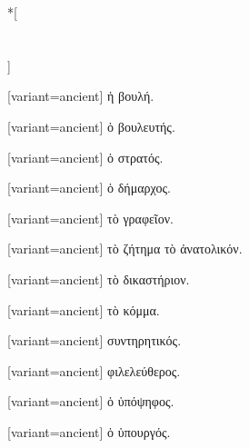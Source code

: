 \switchcolumn[0]*[{%
\section*{%
}}]
%
\switchcolumn
\begin{greek}[variant=ancient]%
ἡ βουλή.%
\end{greek}%
\switchcolumn*
{}%
\switchcolumn
\begin{greek}[variant=ancient]%
ὁ βουλευτής.%
\end{greek}%
\switchcolumn*
{}%
\switchcolumn
\begin{greek}[variant=ancient]%
ὁ στρατός.%
\end{greek}%
\switchcolumn*
{}%
\switchcolumn
\begin{greek}[variant=ancient]%
ὁ δήμαρχος.%
\end{greek}%
\switchcolumn*
{}%
\switchcolumn
\begin{greek}[variant=ancient]%
τὸ γραφεῖον.%
\end{greek}%
\switchcolumn*
{}%
\switchcolumn
\begin{greek}[variant=ancient]%
τὸ ζήτημα τὸ ἀνατολικόν.%
\end{greek}%
\switchcolumn*
{}%
\switchcolumn
\begin{greek}[variant=ancient]%
τὸ δικαστήριον.%
\end{greek}%
\switchcolumn*
{}%
\switchcolumn
\begin{greek}[variant=ancient]%
τὸ κόμμα.%
\end{greek}%
\switchcolumn*
{}%
\switchcolumn
\begin{greek}[variant=ancient]%
συντηρητικός.%
\end{greek}%
\switchcolumn*
{}%
\switchcolumn
\begin{greek}[variant=ancient]%
φιλελεύθερος.%
\end{greek}%
\switchcolumn*
{}%
\switchcolumn
\begin{greek}[variant=ancient]%
ὁ ὑπόψηφος.%
\end{greek}%
\switchcolumn*
{}%
\switchcolumn
\begin{greek}[variant=ancient]%
ὁ ὑπουργός.%
\end{greek}%
